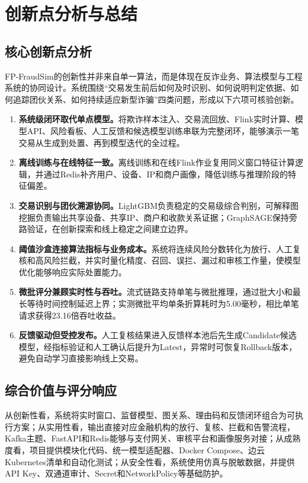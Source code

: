 \section{创新点分析与总结}
\label{sec:conclusion}

\subsection{核心创新点分析}

FP-FraudSim的创新性并非来自单一算法，而是体现在反诈业务、算法模型与工程系统的协同设计。系统围绕“交易发生前后如何及时识别、如何说明判定依据、如何追踪团伙关系、如何持续适应新型诈骗”四类问题，形成以下六项可核验创新。

\begin{enumerate}
  \item \textbf{系统级闭环取代单点模型。}将欺诈样本注入、交易流回放、Flink实时计算、模型API、风险看板、人工反馈和候选模型训练串联为完整闭环，能够演示一笔交易从生成到处置、再到模型迭代的全过程。
  \item \textbf{离线训练与在线特征一致。}离线训练和在线Flink作业复用同义窗口特征计算逻辑，并通过Redis补齐用户、设备、IP和商户画像，降低训练与推理阶段的特征偏差。
  \item \textbf{交易识别与团伙溯源协同。}LightGBM负责稳定的交易级综合判别，可解释图挖掘负责输出共享设备、共享IP、商户和收款关系证据；GraphSAGE保持旁路验证，在创新探索和线上稳定之间建立边界。
  \item \textbf{阈值沙盒连接算法指标与业务成本。}系统将连续风险分数转化为放行、人工复核和高风险拦截，并实时量化精度、召回、误拦、漏过和审核工作量，使模型优化能够响应实际处置能力。
  \item \textbf{微批评分兼顾实时性与吞吐。}流式链路支持单笔与微批推理，通过批大小和最长等待时间控制延迟上界；实测微批平均单条折算耗时为5.00毫秒，相比单笔请求获得23.16倍吞吐收益。
  \item \textbf{反馈驱动但受控发布。}人工复核结果进入反馈样本池后先生成Candidate候选模型，经指标验证和人工确认后提升为Latest，异常时可恢复Rollback版本，避免自动学习直接影响线上交易。
\end{enumerate}

\subsection{综合价值与评分响应}

从创新性看，系统将实时窗口、监督模型、图关系、理由码和反馈闭环组合为可执行方案；从实用性看，输出直接对应金融机构的放行、复核、拦截和告警流程，Kafka主题、FastAPI和Redis能够与支付网关、审核平台和画像服务对接；从成熟度看，项目提供模块化代码、统一模型适配器、Docker Compose、边云Kubernetes清单和自动化测试；从安全性看，系统使用仿真与脱敏数据，并提供API Key、双通道审计、Secret和NetworkPolicy等基础防护。

